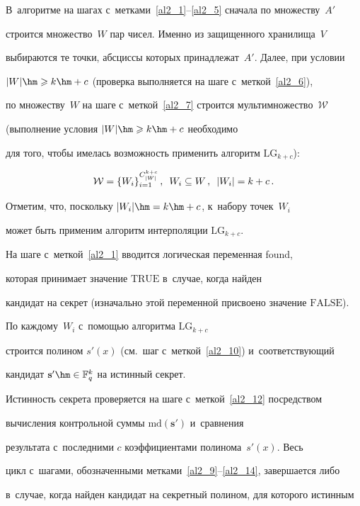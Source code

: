 В~алгоритме на шагах с~метками~\ref{al2_1}--\ref{al2_5} сначала по множеству~$A'$ 


строится множество~$W$ пар чисел. Именно из защищенного хранилища~$V$ 


выбираются те точки, абсциссы которых принадлежат~$A'$. Далее, при условии 


$|W|\hm\geqslant k\hm+c$ (проверка выполняется на шаге с~меткой~\ref{al2_6}), 


по множеству~$W$ на шаге с~меткой~\ref{al2_7} строится мультимножество~$\mathcal{W}$ 


(выполнение условия $|W|\hm\geqslant k\hm+c$ необходимо


 для того, чтобы имелась возможность применить алгоритм $\mathrm{LG}_{k+c}$):


\begin{equation}


\label{for_LG}


\mathcal{W}=\{W_i\}_{i=1}^{C^{k+c}_{|W|}}\,, \enskip W_i\subseteq W\,,\enskip |W_i|=k+c\,.


\end{equation}


Отметим, что, поскольку $|W_i|\hm=k\hm+c$, к~набору точек~$W_i$ 


может быть применим алгоритм интерполяции $\mathrm{LG}_{k+c}$. 


На шаге с~меткой~\ref{al2_1} вводится логическая переменная found, 


которая принимает значение $\mathrm{TRUE}$ в~случае, когда найден 


кандидат на секрет (изначально этой переменной присвоено значение $\mathrm{FALSE}$). 


По каждому~$W_i$ с~помощью алгоритма $\mathrm{LG}_{k+c}$ 


строится полином $s'(x)$ (см.\ шаг с~меткой~\ref{al2_10}) и~соответствующий 


кандидат $\mathbf{s}'\hm\in\mathbb{F}^{k}_q$ на истинный секрет. 


Истинность секрета проверяется на шаге с~меткой~\ref{al2_12} посредством 


вычисления контрольной суммы $\mathrm{md}(\mathbf{s}')$ и~сравнения 


результата с~последними $c$ коэффициентами полинома~$s'(x)$. Весь 


цикл с~шагами, обозначенными метками~\ref{al2_9}--\ref{al2_14}, завершается либо 


в~случае, когда найден кандидат на секретный полином, для которого истинным 


